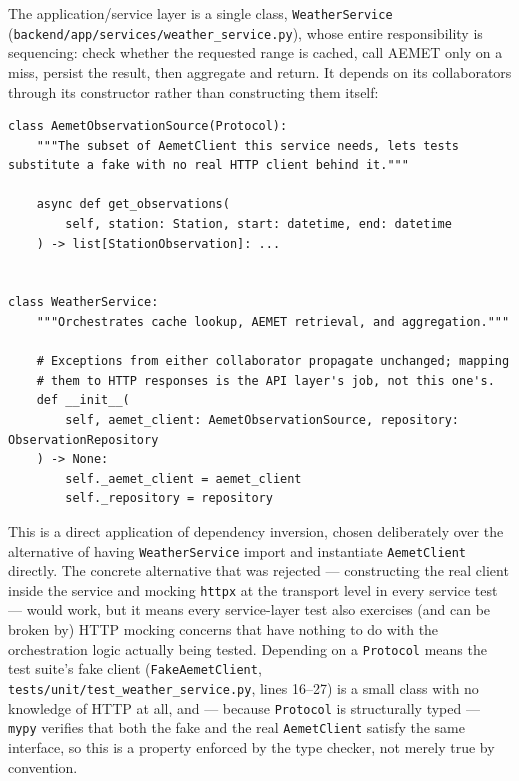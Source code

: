 \documentclass[11pt,a4paper]{article}
\begin{document}
The application/service layer is a single class,
\texttt{WeatherService} (\texttt{backend/app/services/weather\_service.py}),
whose entire responsibility is sequencing: check whether the requested
range is cached, call AEMET only on a miss, persist the result, then
aggregate and return. It depends on its collaborators through its
constructor rather than constructing them itself:

\begin{lstlisting}[caption={\texttt{WeatherService} depends on an AEMET source through a \texttt{Protocol}, not the concrete client class. \texttt{backend/app/services/weather\_service.py}, lines 12--29.}]
class AemetObservationSource(Protocol):
    """The subset of AemetClient this service needs, lets tests substitute a fake with no real HTTP client behind it."""

    async def get_observations(
        self, station: Station, start: datetime, end: datetime
    ) -> list[StationObservation]: ...


class WeatherService:
    """Orchestrates cache lookup, AEMET retrieval, and aggregation."""

    # Exceptions from either collaborator propagate unchanged; mapping
    # them to HTTP responses is the API layer's job, not this one's.
    def __init__(
        self, aemet_client: AemetObservationSource, repository: ObservationRepository
    ) -> None:
        self._aemet_client = aemet_client
        self._repository = repository
\end{lstlisting}

This is a direct application of dependency inversion, chosen deliberately
over the alternative of having \texttt{WeatherService} import and
instantiate \texttt{AemetClient} directly. The concrete alternative that
was rejected --- constructing the real client inside the service and
mocking \texttt{httpx} at the transport level in every service test ---
would work, but it means every service-layer test also exercises (and can
be broken by) HTTP mocking concerns that have nothing to do with the
orchestration logic actually being tested. Depending on a \texttt{Protocol}
means the test suite's fake client
(\texttt{FakeAemetClient}, \texttt{tests/unit/test\_weather\_service.py},
lines 16--27) is a small class with no knowledge of HTTP at all, and ---
because \texttt{Protocol} is structurally typed --- \texttt{mypy} verifies
that both the fake and the real \texttt{AemetClient} satisfy the same
interface, so this is a property enforced by the type checker, not merely
true by convention.
\end{document}
